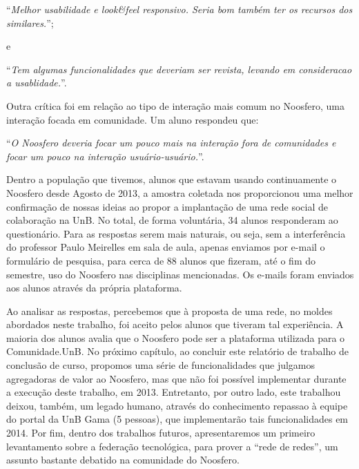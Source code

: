 \begin{center}
``\textit{Melhor usabilidade e look\&feel responsivo. Seria bom também ter os
recursos dos similares.}'';
\end{center}

e

\begin{center}
``\textit{Tem algumas funcionalidades que deveriam ser revista, levando em
consideracao a usablidade.}''.
\end{center}

Outra crítica foi em relação ao tipo de interação mais comum no Noosfero,
uma interação focada em comunidade. Um aluno respondeu que:

\begin{center}
``\textit{O Noosfero deveria focar um pouco mais na interação fora de
comunidades e focar um pouco na interação usuário-usuário.}''.
\end{center}


Dentro a população que tivemos, alunos que estavam usando continuamente o
Noosfero desde Agosto de 2013, a amostra coletada nos proporcionou uma melhor
confirmação de nossas ideias ao propor a implantação de uma rede social de
colaboração na UnB.
%
No total, de forma voluntária, 34 alunos responderam ao questionário. Para as
respostas serem mais naturais, ou seja, sem a interferência do professor Paulo
Meirelles em sala de aula, apenas enviamos por e-mail o formulário de pesquisa,
para cerca de 88 alunos que fizeram, até o fim do semestre, uso do Noosfero
nas disciplinas mencionadas.
%
Os e-mails foram enviados aos alunos através da própria plataforma.

Ao analisar as respostas, percebemos que à proposta de uma rede, no moldes
abordados neste trabalho, foi aceito pelos alunos que tiveram tal experiência.
%
A maioria dos alunos avalia que o Noosfero pode ser a plataforma
utilizada para o Comunidade.UnB.
%
No próximo capítulo, ao concluir este relatório de trabalho de conclusão de curso,
propomos uma série de funcionalidades que julgamos agregadoras de valor ao
Noosfero, mas que não foi possível implementar durante a
execução deste trabalho, em 2013.
%
Entretanto, por outro lado, este trabalhou deixou, também, um legado humano,
através do conhecimento repassao à equipe do portal da UnB Gama (5 pessoas), que
implementarão tais funcionalidades em 2014.
%
Por fim, dentro dos trabalhos futuros, apresentaremos um primeiro levantamento
sobre a federação tecnológica, para prover a ``rede de redes'', um assunto
bastante debatido na comunidade do Noosfero.
